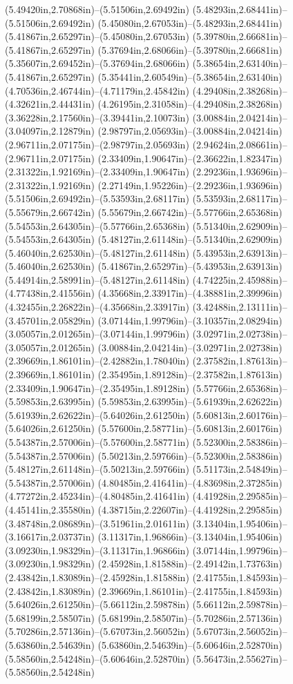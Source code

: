 (5.49420in,2.70868in)--(5.51506in,2.69492in) (5.48293in,2.68441in)--(5.51506in,2.69492in) (5.45080in,2.67053in)--(5.48293in,2.68441in) (5.41867in,2.65297in)--(5.45080in,2.67053in) (5.39780in,2.66681in)--(5.41867in,2.65297in) (5.37694in,2.68066in)--(5.39780in,2.66681in) (5.35607in,2.69452in)--(5.37694in,2.68066in) (5.38654in,2.63140in)--(5.41867in,2.65297in) (5.35441in,2.60549in)--(5.38654in,2.63140in) (4.70536in,2.46744in)--(4.71179in,2.45842in) (4.29408in,2.38268in)--(4.32621in,2.44431in) (4.26195in,2.31058in)--(4.29408in,2.38268in) (3.36228in,2.17560in)--(3.39441in,2.10073in) (3.00884in,2.04214in)--(3.04097in,2.12879in) (2.98797in,2.05693in)--(3.00884in,2.04214in) (2.96711in,2.07175in)--(2.98797in,2.05693in) (2.94624in,2.08661in)--(2.96711in,2.07175in) (2.33409in,1.90647in)--(2.36622in,1.82347in) (2.31322in,1.92169in)--(2.33409in,1.90647in) (2.29236in,1.93696in)--(2.31322in,1.92169in) (2.27149in,1.95226in)--(2.29236in,1.93696in) (5.51506in,2.69492in)--(5.53593in,2.68117in) (5.53593in,2.68117in)--(5.55679in,2.66742in) (5.55679in,2.66742in)--(5.57766in,2.65368in) (5.54553in,2.64305in)--(5.57766in,2.65368in) (5.51340in,2.62909in)--(5.54553in,2.64305in) (5.48127in,2.61148in)--(5.51340in,2.62909in) (5.46040in,2.62530in)--(5.48127in,2.61148in) (5.43953in,2.63913in)--(5.46040in,2.62530in) (5.41867in,2.65297in)--(5.43953in,2.63913in) (5.44914in,2.58991in)--(5.48127in,2.61148in) (4.74225in,2.45988in)--(4.77438in,2.41556in) (4.35668in,2.33917in)--(4.38881in,2.39996in) (4.32455in,2.26822in)--(4.35668in,2.33917in) (3.42488in,2.13111in)--(3.45701in,2.05829in) (3.07144in,1.99796in)--(3.10357in,2.08294in) (3.05057in,2.01265in)--(3.07144in,1.99796in) (3.02971in,2.02738in)--(3.05057in,2.01265in) (3.00884in,2.04214in)--(3.02971in,2.02738in) (2.39669in,1.86101in)--(2.42882in,1.78040in) (2.37582in,1.87613in)--(2.39669in,1.86101in) (2.35495in,1.89128in)--(2.37582in,1.87613in) (2.33409in,1.90647in)--(2.35495in,1.89128in) (5.57766in,2.65368in)--(5.59853in,2.63995in) (5.59853in,2.63995in)--(5.61939in,2.62622in) (5.61939in,2.62622in)--(5.64026in,2.61250in) (5.60813in,2.60176in)--(5.64026in,2.61250in) (5.57600in,2.58771in)--(5.60813in,2.60176in) (5.54387in,2.57006in)--(5.57600in,2.58771in) (5.52300in,2.58386in)--(5.54387in,2.57006in) (5.50213in,2.59766in)--(5.52300in,2.58386in) (5.48127in,2.61148in)--(5.50213in,2.59766in) (5.51173in,2.54849in)--(5.54387in,2.57006in) (4.80485in,2.41641in)--(4.83698in,2.37285in) (4.77272in,2.45234in)--(4.80485in,2.41641in) (4.41928in,2.29585in)--(4.45141in,2.35580in) (4.38715in,2.22607in)--(4.41928in,2.29585in) (3.48748in,2.08689in)--(3.51961in,2.01611in) (3.13404in,1.95406in)--(3.16617in,2.03737in) (3.11317in,1.96866in)--(3.13404in,1.95406in) (3.09230in,1.98329in)--(3.11317in,1.96866in) (3.07144in,1.99796in)--(3.09230in,1.98329in) (2.45928in,1.81588in)--(2.49142in,1.73763in) (2.43842in,1.83089in)--(2.45928in,1.81588in) (2.41755in,1.84593in)--(2.43842in,1.83089in) (2.39669in,1.86101in)--(2.41755in,1.84593in) (5.64026in,2.61250in)--(5.66112in,2.59878in) (5.66112in,2.59878in)--(5.68199in,2.58507in) (5.68199in,2.58507in)--(5.70286in,2.57136in) (5.70286in,2.57136in)--(5.67073in,2.56052in) (5.67073in,2.56052in)--(5.63860in,2.54639in) (5.63860in,2.54639in)--(5.60646in,2.52870in) (5.58560in,2.54248in)--(5.60646in,2.52870in) (5.56473in,2.55627in)--(5.58560in,2.54248in) 